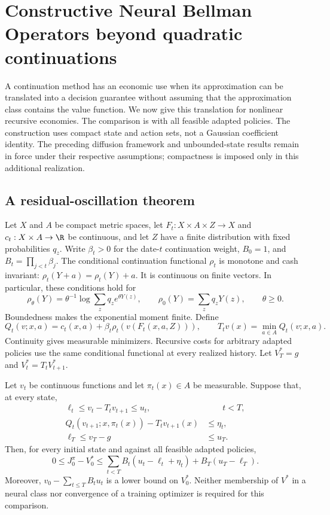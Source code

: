 \section{Constructive Neural Bellman Operators beyond quadratic continuations}
\label{sec:r39nonlinear}

A continuation method has an economic use when its approximation can be
translated into a decision guarantee without assuming that the approximation
class contains the value function. We now give this translation for nonlinear
recursive economies. The comparison is with all feasible adapted policies.
The construction uses compact state and action sets, not a Gaussian coefficient
identity. The preceding diffusion framework and unbounded-state results remain
in force under their respective assumptions; compactness is imposed only in
this additional realization.

\subsection{A residual-oscillation theorem}
Let $X$ and $A$ be compact metric spaces, let $F_t:X\times A\times Z\to X$
and $c_t:X\times A\to\R$ be continuous, and let $Z$ have a finite distribution
with fixed probabilities $q_z$. Write $\beta_t>0$ for the date-$t$ continuation
weight, $B_0=1$, and $B_t=\prod_{j<t}\beta_j$. The conditional continuation
functional $\rho_t$ is monotone and cash invariant:
$\rho_t(Y+a)=\rho_t(Y)+a$. It is continuous on finite vectors. In particular,
these conditions hold for
\begin{equation}\label{eq:r39risk}
 \rho_\theta(Y)=\theta^{-1}\log\sum_zq_z e^{\theta Y(z)},\qquad
 \rho_0(Y)=\sum_zq_zY(z),\qquad \theta\geq0.
\end{equation}
Boundedness makes the exponential moment finite. Define
\[
 Q_t(v;x,a)=c_t(x,a)+\beta_t\rho_t(v(F_t(x,a,Z))),\qquad
 T_tv(x)=\min_{a\in A}Q_t(v;x,a).
\]
Continuity gives measurable minimizers. Recursive costs for arbitrary adapted
policies use the same conditional functional at every realized history. Let
$V_T^*=g$ and $V_t^*=T_tV_{t+1}^*$.

\begin{theorem}\label{thm:r39comparison}
Let $v_t$ be continuous functions and let $\pi_t(x)\in A$ be measurable.
Suppose that, at every state,
\begin{align}
 \ell_t\leq v_t-T_tv_{t+1}\leq u_t,&\qquad t<T,\label{eq:r39residual}\\
 Q_t(v_{t+1};x,\pi_t(x))-T_tv_{t+1}(x)&\leq\eta_t,\label{eq:r39actor}\\
 \ell_T\leq v_T-g&\leq u_T.\nonumber
\end{align}
Then, for every initial state and against all feasible adapted policies,
\begin{equation}\label{eq:r39loss}
 0\leq J_0^\pi-V_0^*
 \leq\sum_{t<T} B_t(u_t-\ell_t+\eta_t)+B_T(u_T-\ell_T).
\end{equation}
Moreover, $v_0-\sum_{t\leq T}B_tu_t$ is a lower bound on $V_0^*$.
Neither membership of $V^*$ in a neural class nor convergence of a training
optimizer is required for this comparison.
\end{theorem}

